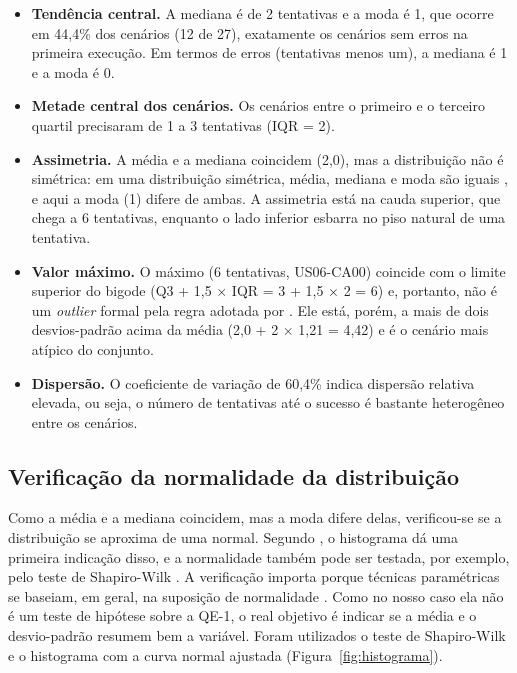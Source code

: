 \begin{itemize}
    \item \textbf{Tendência central.} A mediana é de 2 tentativas e a moda é 1, que ocorre em 44,4\% dos cenários (12 de 27), exatamente os cenários sem erros na primeira execução. Em termos de erros (tentativas menos um), a mediana é 1 e a moda é 0.
    \item \textbf{Metade central dos cenários.} Os cenários entre o primeiro e o terceiro quartil precisaram de 1 a 3 tentativas (IQR = 2).
    \item \textbf{Assimetria.} A média e a mediana coincidem (2,0), mas a distribuição não é simétrica: em uma distribuição simétrica, média, mediana e moda são iguais \cite[Fig.~11.2, p.~156]{Wohlin2012}, e aqui a moda (1) difere de ambas. A assimetria está na cauda superior, que chega a 6 tentativas, enquanto o lado inferior esbarra no piso natural de uma tentativa.
    \item \textbf{Valor máximo.} O máximo (6 tentativas, US06-CA00) coincide com o limite superior do bigode (Q3 + 1,5 × IQR = 3 + 1,5 × 2 = 6) e, portanto, não é um \textit{outlier} formal pela regra adotada por . Ele está, porém, a mais de dois desvios-padrão acima da média (2,0 + 2 × 1,21 = 4,42) e é o cenário mais atípico do conjunto.
    \item \textbf{Dispersão.} O coeficiente de variação de 60,4\% indica dispersão relativa elevada, ou seja, o número de tentativas até o sucesso é bastante heterogêneo entre os cenários.
\end{itemize}

\subsection{Verificação da normalidade da distribuição}
\label{subsec:normalidade}

Como a média e a mediana coincidem, mas a moda difere delas, verificou-se se a distribuição se aproxima de uma normal. Segundo , o histograma dá uma primeira indicação disso, e a normalidade também pode ser testada, por exemplo, pelo teste de Shapiro-Wilk \cite[p.~183]{Wohlin2012}. A verificação importa porque técnicas paramétricas se baseiam, em geral, na suposição de normalidade \cite[p.~166]{Wohlin2012}. Como no nosso caso ela não é um teste de hipótese sobre a QE-1, o real objetivo é indicar se a média e o desvio-padrão resumem bem a variável. Foram utilizados o teste de Shapiro-Wilk e o histograma com a curva normal ajustada (Figura~\ref{fig:histograma}).

